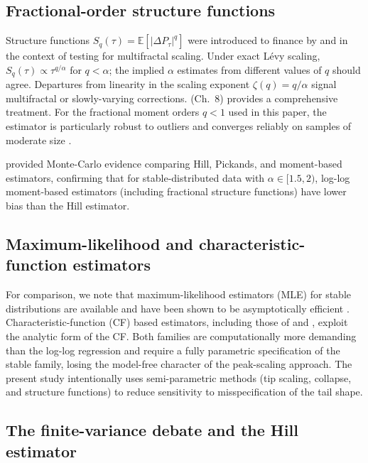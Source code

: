 \documentclass[12pt,a4paper]{article}
\begin{document}
\subsection{Fractional-order structure functions}

Structure functions $S_q(\tau) = \mathbb{E}[|\Delta P_\tau|^q]$ were introduced
to finance by \textcite{Mandelbrot1997} and \textcite{MuzyBacry1993} in the
context of testing for multifractal scaling. Under exact Lévy scaling,
$S_q(\tau) \propto \tau^{q/\alpha}$ for $q < \alpha$; the implied $\alpha$
estimates from different values of $q$ should agree. Departures from linearity
in the scaling exponent $\zeta(q) = q/\alpha$ signal multifractal or
slowly-varying corrections. \textcite{BouchaudPotters2003} (Ch.~8) provides a
comprehensive treatment. For the fractional moment orders $q < 1$ used in this
paper, the estimator is particularly robust to outliers and converges reliably
on samples of moderate size \parencite{Uchaikin2003}.

\textcite{Barunik2010} provided Monte-Carlo evidence comparing Hill, Pickands,
and moment-based estimators, confirming that for stable-distributed data with
$\alpha \in [1.5,2)$, log-log moment-based estimators (including fractional
structure functions) have lower bias than the Hill estimator.

\subsection{Maximum-likelihood and characteristic-function estimators}

For comparison, we note that maximum-likelihood estimators (MLE) for stable
distributions are available \parencite{Nolan2001} and have been shown to be
asymptotically efficient \parencite{DuMoutierde1983}. Characteristic-function
(CF) based estimators, including those of \textcite{Feuerverger1981} and
\textcite{Press1972}, exploit the analytic form of the CF. Both families are
computationally more demanding than the log-log regression and require a fully
parametric specification of the stable family, losing the model-free character
of the peak-scaling approach. The present study intentionally uses
semi-parametric methods (tip scaling, collapse, and structure functions) to
reduce sensitivity to misspecification of the tail shape.

\subsection{The finite-variance debate and the Hill estimator}
\end{document}
